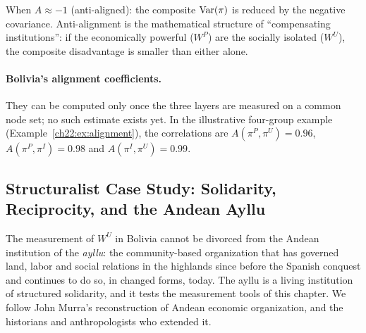 \documentclass[../structural_economics_book.tex]{subfiles}
\begin{document}
When $A \approx -1$ (anti-aligned): the composite $\operatorname{Var}(\pi)$ is reduced by the negative covariance. Anti-alignment is the mathematical structure of ``compensating institutions'': if the economically powerful ($W^P$) are the socially isolated ($W^U$), the composite disadvantage is smaller than either alone.

\paragraph{Bolivia's alignment coefficients.} They can be computed only once the three layers are measured on a common node set; no such estimate exists yet. In the illustrative four-group example (Example~\ref{ch22:ex:alignment}), the correlations are $A(\pi^P, \pi^U) = 0.96$, $A(\pi^P, \pi^I) = 0.98$ and $A(\pi^I, \pi^U) = 0.99$.


\subsection*{Structuralist Case Study: Solidarity, Reciprocity, and the Andean Ayllu}

The measurement of $W^U$ in Bolivia cannot be divorced from the Andean institution of the \textit{ayllu}: the community-based organization that has governed land, labor and social relations in the highlands since before the Spanish conquest and continues to do so, in changed forms, today. The ayllu is a living institution of structured solidarity, and it tests the measurement tools of this chapter. We follow John Murra's reconstruction of Andean economic organization, and the historians and anthropologists who extended it.
\end{document}
